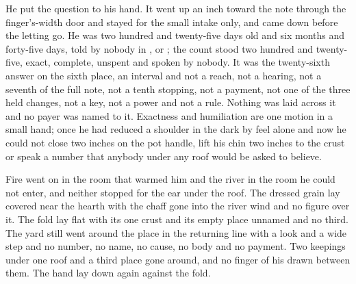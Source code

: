 He put the question to his hand. It went up an inch toward the note through the finger's-width door and stayed for the small intake only, and came down before the letting go. He was two hundred and twenty-five days old and six months and forty-five days, told by nobody in ,  or ; the count stood two hundred and twenty-five, exact, complete, unspent and spoken by nobody. It was the twenty-sixth answer on the sixth place, an interval and not a reach, not a hearing, not a seventh of the full note, not a tenth stopping, not a payment, not one of the three held changes, not a key, not a power and not a rule. Nothing was laid across it and no payer was named to it. Exactness and humiliation are one motion in a small hand; once he had reduced a shoulder in the dark by feel alone and now he could not close two inches on the pot handle, lift his chin two inches to the crust or speak a number that anybody under any roof would be asked to believe.

Fire went on in the room that warmed him and the river in the room he could not enter, and neither stopped for the ear under the roof. The dressed grain lay covered near the hearth with the chaff gone into the river wind and no figure over it. The fold lay flat with its one crust and its empty place unnamed and no third. The yard still went around the place in the returning line with a look and a wide step and no number, no name, no cause, no body and no payment. Two keepings under one roof and a third place gone around, and no finger of his drawn between them. The hand lay down again against the fold.
